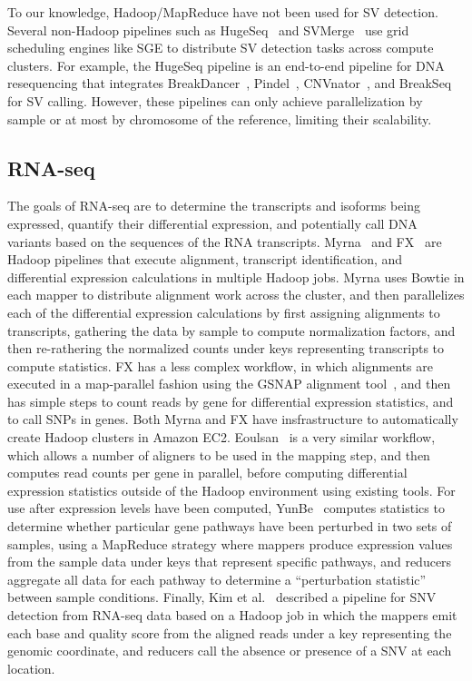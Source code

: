 To our knowledge, Hadoop/MapReduce have not been used for SV detection. Several non-Hadoop pipelines such as HugeSeq~\cite{Lam:2012jy} and SVMerge~\cite{Wong:2010p1271} use grid scheduling engines like SGE to distribute SV detection tasks across compute clusters. For example, the HugeSeq pipeline is an end-to-end pipeline for DNA resequencing that integrates BreakDancer~\cite{Chen:2009p3}, Pindel~\cite{Ye:2009p2}, CNVnator~\cite{Abyzov:2011bk}, and BreakSeq~\cite{Lam:2010p1383} for SV calling. However, these pipelines can only achieve parallelization by sample or at most by chromosome of the reference, limiting their scalability.

\subsection{RNA-seq}

The goals of RNA-seq are to determine the transcripts and isoforms being expressed, quantify their differential expression, and potentially call DNA variants based on the sequences of the RNA transcripts.  Myrna~\cite{Langmead:2010p1268} and FX~\cite{Hong:2012du} are Hadoop pipelines that execute alignment, transcript identification, and differential expression calculations in multiple Hadoop jobs. Myrna uses Bowtie in each mapper to distribute alignment work across the cluster, and then parallelizes each of the differential expression calculations by first assigning alignments to transcripts, gathering the data by sample to compute normalization factors, and then re-rathering the normalized counts under keys representing transcripts to compute statistics. FX has a less complex workflow, in which alignments are executed in a map-parallel fashion using the GSNAP alignment tool~\cite{Wu:2010p875}, and then has simple steps to count reads by gene for differential expression statistics, and to call SNPs in genes. Both Myrna and FX have insfrastructure to automatically create Hadoop clusters in Amazon EC2. Eoulsan~\cite{Jourdren:2012dc} is a very similar workflow, which allows a number of aligners to be used in the mapping step, and then computes read counts per gene in parallel, before computing differential expression statistics outside of the Hadoop environment using existing tools. For use after expression levels have been computed, YunBe~\cite{Zhang:2011p1823} computes statistics to determine whether particular gene pathways have been perturbed in two sets of samples, using a MapReduce strategy where mappers produce expression values from the sample data under keys that represent specific pathways, and reducers aggregate all data for each pathway to determine a ``perturbation statistic'' between sample conditions. Finally, Kim et al.~\cite{Kim2011RNASEQ} described a pipeline for SNV detection from RNA-seq data based on a Hadoop job in which the mappers emit each base and quality score from the aligned reads under a key representing the genomic coordinate, and reducers call the absence or presence of a SNV at each location.


